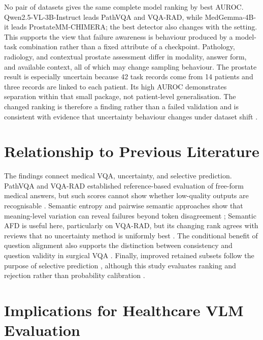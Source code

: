 No pair of datasets gives the same complete model ranking by best AUROC. Qwen2.5-VL-3B-Instruct leads PathVQA and VQA-RAD, while MedGemma-4B-it leads ProstateMM-CHIMERA; the best detector also changes with the setting. This supports the view that failure awareness is behaviour produced by a model-task combination rather than a fixed attribute of a checkpoint. Pathology, radiology, and contextual prostate assessment differ in modality, answer form, and available context, all of which may change sampling behaviour. The prostate result is especially uncertain because 42 task records come from 14 patients and three records are linked to each patient. Its high AUROC demonstrates separation within that small package, not patient-level generalisation. The changed ranking is therefore a finding rather than a failed validation and is consistent with evidence that uncertainty behaviour changes under dataset shift \citep{ovadia2019uncertainty}.

\section{Relationship to Previous Literature}

The findings connect medical VQA, uncertainty, and selective prediction. PathVQA and VQA-RAD established reference-based evaluation of free-form medical answers, but such scores cannot show whether low-quality outputs are recognisable \citep{he2020pathvqa,lau2018vqarad}. Semantic entropy and pairwise semantic approaches show that meaning-level variation can reveal failures beyond token disagreement \citep{farquhar2024semanticentropy,nguyen2025pairwisesemantic}; Semantic AFD is useful here, particularly on VQA-RAD, but its changing rank agrees with reviews that no uncertainty method is uniformly best \citep{shorinwa2025uqsurvey}. The conditional benefit of question alignment also supports the distinction between consistency and question validity in surgical VQA \citep{carlini2026qasnne}. Finally, improved retained subsets follow the purpose of selective prediction \citep{geifman2017selective}, although this study evaluates ranking and rejection rather than probability calibration \citep{guo2017calibration}.

\section{Implications for Healthcare VLM Evaluation}

